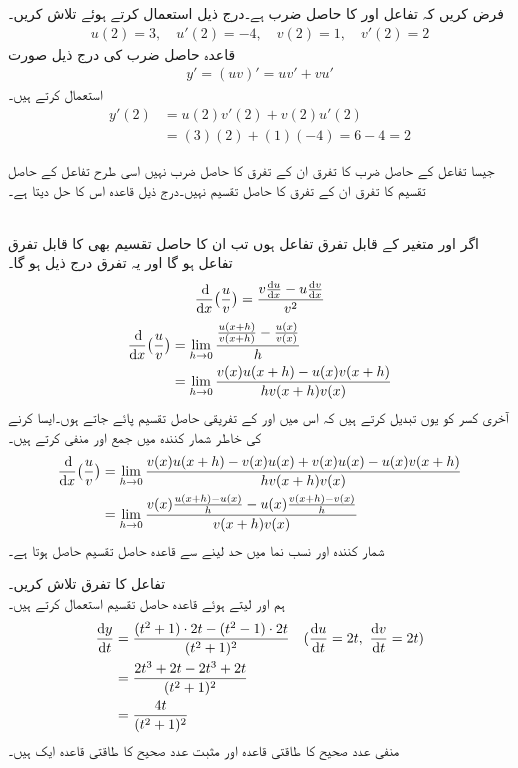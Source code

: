 فرض کریں کہ  تفاعل  اور  کا حاصل ضرب ہے۔درج ذیل استعمال کرتے ہوئے  تلاش کریں۔
\begin{align*}
u(2)=3,\quad u'(2)=-4,\quad v(2)=1,\quad v'(2)=2
\end{align*}
قاعدہ حاصل ضرب کی درج ذیل صورت
\begin{align*}
y'=(uv)'=uv'+vu'
\end{align*}
استعمال کرتے ہیں۔
\begin{align*}
y'(2)&=u(2)v'(2)+v(2)u'(2)\\
&=(3)(2)+(1)(-4)=6-4=2
\end{align*}

جیسا تفاعل کے حاصل ضرب کا تفرق ان کے تفرق کا حاصل ضرب نہیں  اسی طرح تفاعل کے حاصل تقسیم کا تفرق ان کے تفرق کا حاصل تقسیم نہیں۔درج ذیل قاعدہ اس کا حل دیتا ہے۔

\\
اگر  اور  متغیر  کے قابل تفرق تفاعل ہوں تب ان کا حاصل تقسیم  بھی  کا قابل تفرق تفاعل ہو گا اور یہ تفرق درج ذیل ہو گا۔
\begin{align*}
\frac{\dif}{\dif x}\big(\frac{u}{v}\big)=\frac{v\frac{\dif u}{\dif x}-u\frac{\dif v}{\dif x}}{v^2}
\end{align*}
\begin{align*}
\frac{\dif}{\dif x}\big(\frac{u}{v}\big)&=\lim_{h\to 0}\frac{\frac{u(x+h)}{v(x+h)}-\frac{u(x)}{v(x)}}{h}\\
&=\lim_{h\to 0}\frac{v(x)u(x+h)-u(x)v(x+h)}{hv(x+h)v(x)}
\end{align*}
 آخری کسر کو یوں تبدیل کرتے ہیں کہ اس میں  اور  کے تفریقی حاصل تقسیم پائے جاتے ہوں۔ایسا کرنے کی خاطر شمار کنندہ میں  جمع اور منفی کرتے ہیں۔
\begin{align*}
\frac{\dif}{\dif x}\big(\frac{u}{v}\big)&=\lim_{h\to 0}\frac{v(x)u(x+h)-v(x)u(x)+v(x)u(x)-u(x)v(x+h)}{hv(x+h)v(x)}\\
&=\lim_{h\to 0}\frac{v(x)\frac{u(x+h)-u(x)}{h}-u(x)\frac{v(x+h)-v(x)}{h}}{v(x+h)v(x)}
\end{align*}
شمار کنندہ اور نسب نما میں حد لینے سے قاعدہ حاصل تقسیم حاصل ہوتا ہے۔

تفاعل  کا تفرق تلاش کریں۔\\
ہم  اور  لیتے ہوئے قاعدہ حاصل تقسیم استعمال کرتے ہیں۔
\begin{align*}
\frac{\dif y}{\dif t}&=\frac{(t^2+1)\cdot 2t-(t^2-1)\cdot 2t}{(t^2+1)^2}&&({\frac{\dif u}{\dif t}=2t,\,\, \frac{\dif v}{\dif t}=2t})\\
&=\frac{2t^3+2t-2t^3+2t}{(t^2+1)^2}\\
&=\frac{4t}{(t^2+1)^2}
\end{align*}
منفی عدد صحیح کا طاقتی قاعدہ اور مثبت عدد صحیح کا طاقتی قاعدہ ایک ہیں۔

